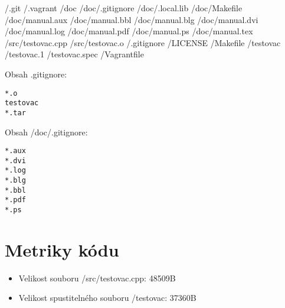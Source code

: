 \documentclass[a4paper,11pt]{article}
\begin{document}
/.git \newline
/.vagrant \newline
/doc \newline
/doc/.gitignore \newline
/doc/.local.lib \newline
/doc/Makefile \newline
/doc/manual.aux \newline
/doc/manual.bbl \newline
/doc/manual.blg \newline
/doc/manual.dvi \newline
/doc/manual.log \newline
/doc/manual.pdf \newline
/doc/manual.ps \newline
/doc/manual.tex \newline
/src/testovac.cpp \newline
/src/testovac.o \newline
/.gitignore \newline
/LICENSE \newline
/Makefile \newline
/testovac \newline
/testovac.1 \newline
/testovac.spec \newline
/Vagrantfile \newline

Obsah .gitignore:

\begin{lstlisting}[frame=single,breaklines]
*.o
testovac
*.tar
\end{lstlisting}

Obsah /doc/.gitignore:

\begin{lstlisting}[frame=single,breaklines]
*.aux
*.dvi
*.log
*.blg
*.bbl
*.pdf
*.ps
\end{lstlisting}

\section*{Metriky kódu}
\begin{itemize}
  \item Velikost souboru /src/testovac.cpp: 48509B
  \item Velikost spustitelného souboru /testovac: 37360B
\end{itemize}
\end{document}
